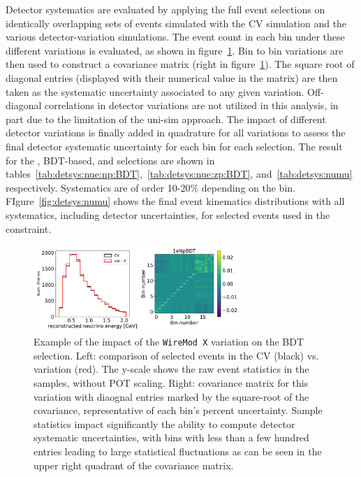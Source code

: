 \par Detector systematics are evaluated by applying the full event selections on identically overlapping sets of events simulated with the CV simulation and the various detector-variation simulations. The event count in each bin under these different variations is evaluated, as shown in figure~\ref{fig:detsys:selection}. Bin to bin variations are then used to construct a covariance matrix (right in figure~\ref{fig:detsys:selection}). The square root of diagonal entries (displayed with their numerical value in the matrix) are then taken as the systematic uncertainty associated to any given variation. Off-diagonal correlations in detector variations are not utilized in this analysis, in part due to the limitation of the uni-sim approach. The impact of different detector variations is finally added in quadrature for all variations to assess the final detector systematic uncertainty for each bin for each selection. The result for the \npsel, \zpsel BDT-based, and \numu selections are shown in tables~\ref{tab:detsys:nue:np:BDT},~\ref{tab:detsys:nue:zp:BDT},  and~\ref{tab:detsys:numu} respectively. Systematics are of order 10-20\% depending on the bin. %
FIgure~\ref{fig:detsys:numu} shows the final event kinematics distributions with all systematics, including detector uncertainties, for selected \numu events used in the \numu constraint.



\begin{figure}[H]
    \centering
    \includegraphics[width=0.7\textwidth]{detsys/reco_e_07252020_1eNpBDT_X.pdf}
\caption{\label{fig:detsys:selection}Example of the impact of the \texttt{WireMod X} variation on the \npsel BDT selection. Left: comparison of selected events in the CV (black) vs. variation (red). The y-scale shows the raw event statistics in the samples, without POT scaling. Right: covariance matrix for this variation with diaognal entries marked by the square-root of the covariance, representative of each bin's percent uncertainty. Sample statistics impact significantly the ability to compute detector systematic uncertainties, with bins with less than a few hundred entries leading to large statistical fluctuations as can be seen in the upper right quadrant of the covariance matrix.}
\end{figure}



